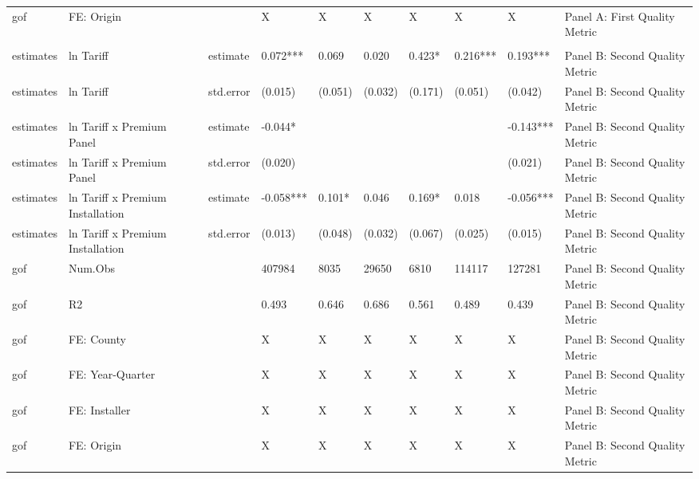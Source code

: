 \begin{table}[!h]
\begin{tabular}[t]{llllllllll}
\hspace{1em}gof & FE: Origin &  & X & X & X & X & X & X & Panel A: First Quality Metric\\
\addlinespace[0.3em]
\multicolumn{10}{l}{\textbf{Panel B: Second Quality Metric}}\\
\hspace{1em}estimates & ln Tariff & estimate & 0.072*** & 0.069 & 0.020 & 0.423* & 0.216*** & 0.193*** & Panel B: Second Quality Metric\\
\hspace{1em}estimates & ln Tariff & std.error & (0.015) & (0.051) & (0.032) & (0.171) & (0.051) & (0.042) & Panel B: Second Quality Metric\\
\hspace{1em}estimates & ln Tariff x Premium Panel & estimate & -0.044* &  &  &  &  & -0.143*** & Panel B: Second Quality Metric\\
\hspace{1em}estimates & ln Tariff x Premium Panel & std.error & (0.020) &  &  &  &  & (0.021) & Panel B: Second Quality Metric\\
\hspace{1em}estimates & ln Tariff x Premium Installation & estimate & -0.058*** & 0.101* & 0.046 & 0.169* & 0.018 & -0.056*** & Panel B: Second Quality Metric\\
\hspace{1em}estimates & ln Tariff x Premium Installation & std.error & (0.013) & (0.048) & (0.032) & (0.067) & (0.025) & (0.015) & Panel B: Second Quality Metric\\
\hspace{1em}gof & Num.Obs &  & 407984 & 8035 & 29650 & 6810 & 114117 & 127281 & Panel B: Second Quality Metric\\
\hspace{1em}gof & R2 &  & 0.493 & 0.646 & 0.686 & 0.561 & 0.489 & 0.439 & Panel B: Second Quality Metric\\
\hspace{1em}gof & FE: County &  & X & X & X & X & X & X & Panel B: Second Quality Metric\\
\hspace{1em}gof & FE: Year-Quarter &  & X & X & X & X & X & X & Panel B: Second Quality Metric\\
\hspace{1em}gof & FE: Installer &  & X & X & X & X & X & X & Panel B: Second Quality Metric\\
\hspace{1em}gof & FE: Origin &  & X & X & X & X & X & X & Panel B: Second Quality Metric\\
\bottomrule
\end{tabular}
\end{table}

